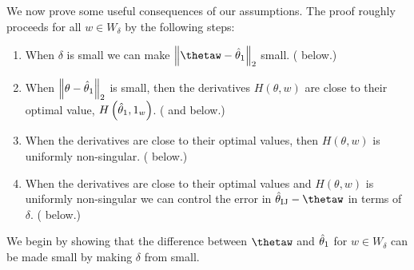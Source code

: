 We now prove some useful consequences of our assumptions. The proof
roughly proceeds for all $w\in W_{\delta}$ by the following steps:
\begin{enumerate}
\item When $\delta$ is small we can make $\norm{{{\thetaw}}-\thetaone}_{2}$
small. ( below.)
\item When $\left\Vert \theta-\hat{\theta}_{1}\right\Vert_{2}$ is small, then the derivatives
$H\left(\theta,w\right)$ are close to their optimal value, $H\left(\hat{\theta}_{1},1_{w}\right)$.
( and 
below.)
\item When the derivatives are close to their optimal values, then $H\left(\theta,w\right)$
is uniformly non-singular. ( below.)
\item When the derivatives are close to their optimal values and $H\left(\theta,w\right)$
is uniformly non-singular we can control the error in $\thetaij-\thetaw$
in terms of $\delta$. ( below.)
\end{enumerate}
We begin by showing that the difference between $\thetaw$ and $\hat{\theta}_{1}$
for $w\in W_{\delta}$ can be made small by making $\delta$ from
 small.

